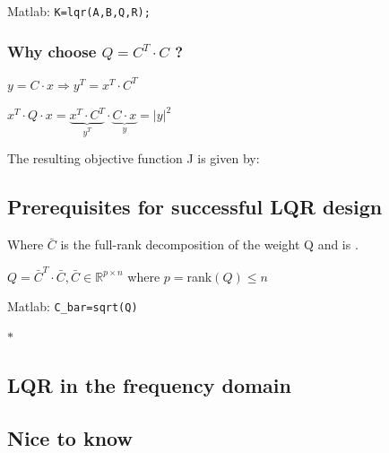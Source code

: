 \documentclass[10pt,a4paper]{scrartcl}
\begin{document}
\begin{multicols*}{3}
	
	
	Matlab: \verb+K=lqr(A,B,Q,R);+
	
	\subsubsection*{Why choose $Q=C^T\cdot C$ ?}
	
	$y=C\cdot x\Rightarrow y^T=x^T\cdot C^T$
	
	$x^T\cdot Q\cdot x=\underbrace{x^T\cdot C^T}_{y^T}\cdot\underbrace{C\cdot x}_{y} = |y|^2$
	
	The resulting objective function J is given by:
	
	
	\subsection*{Prerequisites for successful LQR design}
	
	
	Where $\bar{C}$ is the full-rank decomposition of the weight Q and is .
	
	$Q=\bar{C}^T\cdot \bar{C},\bar{C}\in\mathbb{R}^{p\times n}$ where $p=$rank$(Q)\leq n$
	
	Matlab: \verb+C_bar=sqrt(Q)+
	
	$\ast\quad$
	
	\subsection{LQR in the frequency domain}
	
	
	
	\subsection*{Nice to know}
	

\end{multicols*}
\end{document}
